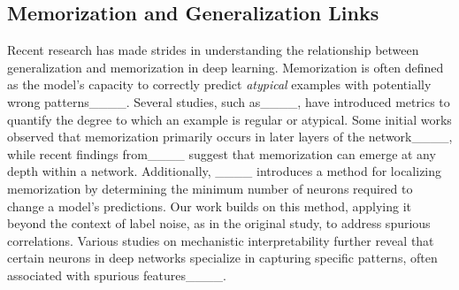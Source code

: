 \subsection{Memorization and Generalization Links} Recent research has made strides in understanding the relationship between generalization and memorization in deep learning. Memorization is often defined as the model's capacity to correctly predict \textit{atypical} examples with potentially wrong patterns____. Several studies, such as____, have introduced metrics to quantify the degree to which an example is regular or atypical. Some initial works observed that memorization primarily occurs in later layers of the network____, while recent findings from____ suggest that memorization can emerge at any depth within a network. Additionally, ____ introduces a method for localizing memorization by determining the minimum number of neurons required to change a model’s predictions. Our work builds on this method, applying it beyond the context of label noise, as in the original study, to address spurious correlations. Various studies on mechanistic interpretability further reveal that certain neurons in deep networks specialize in capturing specific patterns, often associated with spurious features____.
